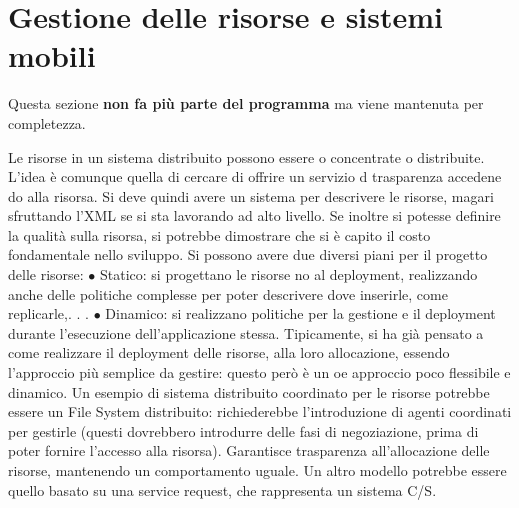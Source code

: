 \section{Gestione delle risorse e sistemi mobili}
Questa sezione \textbf{non fa più parte del programma} ma viene mantenuta per completezza.

Le risorse in un sistema distribuito possono essere o concentrate o distribuite.
L'idea è comunque quella di cercare di offrire un servizio d trasparenza accedene
do alla risorsa.
Si deve quindi avere un sistema per descrivere le risorse, magari sfruttando
l'XML se si sta lavorando ad alto livello. Se inoltre si potesse definire la qualità
sulla risorsa, si potrebbe dimostrare che si è capito il costo fondamentale nello
sviluppo.
Si possono avere due diversi piani per il progetto delle risorse:
$\bullet$ Statico: si progettano le risorse no al deployment, realizzando anche delle
politiche complesse per poter descrivere dove inserirle, come replicarle,. . .
$\bullet$ Dinamico: si realizzano politiche per la gestione e il deployment durante
l'esecuzione dell'applicazione stessa.
Tipicamente, si ha già pensato a come realizzare il deployment delle risorse, alla
loro allocazione, essendo l'approccio più semplice da gestire: questo però è un
oe
approccio poco flessibile e dinamico.
Un esempio di sistema distribuito coordinato per le risorse potrebbe essere
un File System distribuito: richiederebbe l'introduzione di agenti coordinati per
gestirle (questi dovrebbero introdurre delle fasi di negoziazione, prima di poter
fornire l'accesso alla risorsa). Garantisce trasparenza all'allocazione delle risorse,
mantenendo un comportamento uguale. Un altro modello potrebbe essere quello
basato su una service request, che rappresenta un sistema C/S.
